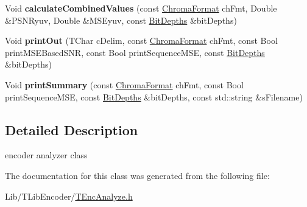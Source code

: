 \begin{DoxyCompactItemize}
\mbox{\label{class_t_enc_analyze_a55c863ebc15869eaf29f212897e3677c}} 
Void {\bfseries calculate\+Combined\+Values} (const \hyperlink{_type_def_8h_a4a6c51c10f2eb04abc7209db7caff39f}{Chroma\+Format} ch\+Fmt, Double \&P\+S\+N\+Ryuv, Double \&M\+S\+Eyuv, const \hyperlink{struct_bit_depths}{Bit\+Depths} \&bit\+Depths)
\item 
\mbox{\label{class_t_enc_analyze_ae62a98a03a10030287067620699a72df}} 
Void {\bfseries print\+Out} (T\+Char c\+Delim, const \hyperlink{_type_def_8h_a4a6c51c10f2eb04abc7209db7caff39f}{Chroma\+Format} ch\+Fmt, const Bool print\+M\+S\+E\+Based\+S\+NR, const Bool print\+Sequence\+M\+SE, const \hyperlink{struct_bit_depths}{Bit\+Depths} \&bit\+Depths)
\item 
\mbox{\label{class_t_enc_analyze_a416f26ab7a25742afd4b031399190c97}} 
Void {\bfseries print\+Summary} (const \hyperlink{_type_def_8h_a4a6c51c10f2eb04abc7209db7caff39f}{Chroma\+Format} ch\+Fmt, const Bool print\+Sequence\+M\+SE, const \hyperlink{struct_bit_depths}{Bit\+Depths} \&bit\+Depths, const std\+::string \&s\+Filename)
\end{DoxyCompactItemize}


\subsection{Detailed Description}
encoder analyzer class 

The documentation for this class was generated from the following file\+:\begin{DoxyCompactItemize}
\item 
Lib/\+T\+Lib\+Encoder/\hyperlink{_t_enc_analyze_8h}{T\+Enc\+Analyze.\+h}\end{DoxyCompactItemize}
